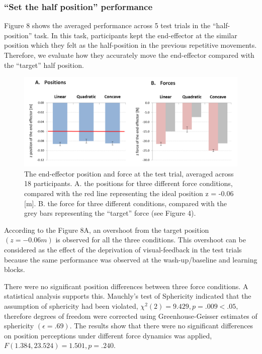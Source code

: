 \subsubsection{“Set the half position” performance}
Figure 8 shows the averaged performance across 5 test trials in the “half-position” task. In this task, participants kept the end-effector at the similar position which they felt as the half-position in the previous repetitive movements. Therefore, we evaluate how they accurately move the end-effector compared with the “target” half position.
%
\begin{figure}
  \centering
  \includegraphics[scale=0.5]{Chie/figs/Figure8.png}
  \caption{The end-effector position and force at the test trial, averaged across 18 participants. 
A. the positions for three different force conditions, compared with the red line representing the ideal position z = -0.06 [m]. B. the force for three different conditions, compared with the grey bars representing the “target” force (see Figure 4).}
  \label{testrial}
\end{figure}
According to the Figure 8A, an overshoot  from the target position $(z = -0.06 m)$ is observed for all the three conditions. This overshoot can be considered as the effect of the deprivation of visual-feedback in the test trials because the same performance was observed at the wash-up/baseline and learning blocks.

There were no significant position differences between three force conditions. A statistical analysis supports this. Mauchly’s test of Sphericity indicated that the assumption of sphericity had been violated, $χ^2 (2) = 9.429, p = .009 < .05, $ therefore degrees of freedom were corrected using Greenhouse-Geisser estimates of sphericity $(\epsilon = .69)$. The results show that there were no significant differences on position perceptions under different force dynamics was applied, $F(1.384, 23.524) = 1.501, p = .240$.

